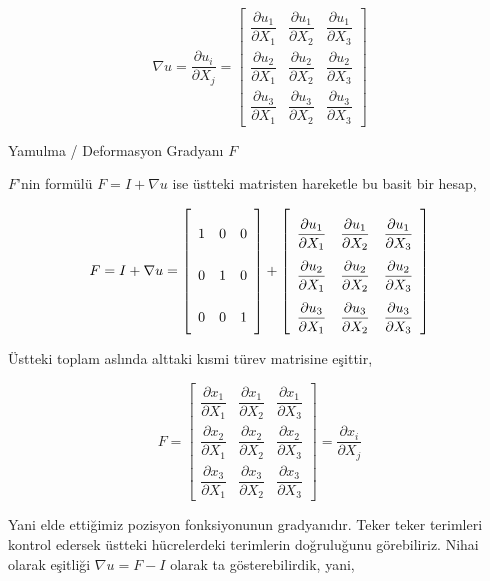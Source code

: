 \documentclass[12pt,fleqn]{article}\usepackage{../../common}
\begin{document}
$$
\renewcommand*{\arraystretch}{2.5}
\nabla u = \frac{\partial u_i}{\partial X_j} =
\left[\begin{array}{ccc}
\dfrac{\partial u_1}{\partial X_1} & \dfrac{\partial u_1}{\partial X_2} & \dfrac{\partial u_1}{\partial X_3} \\
\dfrac{\partial u_2}{\partial X_1} & \dfrac{\partial u_2}{\partial X_2} & \dfrac{\partial u_2}{\partial X_3} \\
\dfrac{\partial u_3}{\partial X_1} & \dfrac{\partial u_3}{\partial X_2} & \dfrac{\partial u_3}{\partial X_3} 
\end{array}\right]
$$

Yamulma / Deformasyon Gradyanı $F$

$F$'nin formülü $F = I + \nabla u$ ise üstteki matristen hareketle bu basit
bir hesap,

$$
F = I + \nabla u = 
\left[\begin{array}{ccc}
1 & 0 & 0 \\ 0 & 1 & 0 \\ 0 & 0 & 1
\end{array}\right] + 
\renewcommand*{\arraystretch}{2.5}
\left[\begin{array}{ccc}
\dfrac{\partial u_1}{\partial X_1} & \dfrac{\partial u_1}{\partial X_2} & \dfrac{\partial u_1}{\partial X_3} \\
\dfrac{\partial u_2}{\partial X_1} & \dfrac{\partial u_2}{\partial X_2} & \dfrac{\partial u_2}{\partial X_3} \\
\dfrac{\partial u_3}{\partial X_1} & \dfrac{\partial u_3}{\partial X_2} & \dfrac{\partial u_3}{\partial X_3} 
\end{array}\right]
$$

Üstteki toplam aslında alttaki kısmi türev matrisine eşittir,

$$
\renewcommand*{\arraystretch}{2.5}
F = \left[\begin{array}{ccc}
\dfrac{\partial x_1}{\partial X_1} & \dfrac{\partial x_1}{\partial X_2} & \dfrac{\partial x_1}{\partial X_3} \\
\dfrac{\partial x_2}{\partial X_1} & \dfrac{\partial x_2}{\partial X_2} & \dfrac{\partial x_2}{\partial X_3} \\
\dfrac{\partial x_3}{\partial X_1} & \dfrac{\partial x_3}{\partial X_2} & \dfrac{\partial x_3}{\partial X_3} 
\end{array}\right] =
\frac{\partial x_i}{\partial X_j}
$$

Yani elde ettiğimiz pozisyon fonksiyonunun gradyanıdır. Teker teker terimleri
kontrol edersek üstteki hücrelerdeki terimlerin doğruluğunu görebiliriz. Nihai
olarak eşitliği $\nabla u = F - I$ olarak ta gösterebilirdik, yani,
\end{document}
